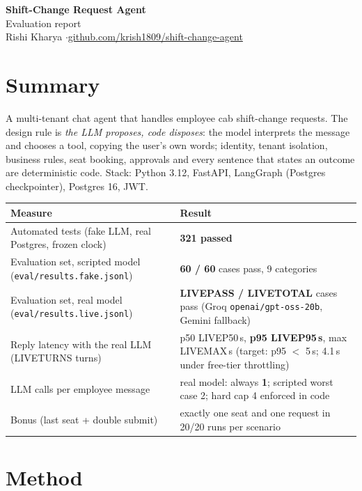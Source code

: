\documentclass[10.5pt,a4paper]{article}
\newcommand{\livepass}{LIVEPASS}
\newcommand{\livetotal}{LIVETOTAL}
\newcommand{\livepfifty}{LIVEP50}
\newcommand{\liveninetyfive}{LIVEP95}
\newcommand{\livemax}{LIVEMAX}
\newcommand{\liveturns}{LIVETURNS}
\begin{document}
\begin{center}
{\LARGE\bfseries Shift-Change Request Agent}\\[3pt]
{\large Evaluation report}\\[4pt]
{\small Rishi Kharya \quad$\cdot$\quad \href{https://github.com/krish1809/shift-change-agent}{github.com/krish1809/shift-change-agent}}
\end{center}

\section{Summary}

A multi-tenant chat agent that handles employee cab shift-change requests. The design rule is
\emph{the LLM proposes, code disposes}: the model interprets the message and chooses a tool, copying the user's
own words; identity, tenant isolation, business rules, seat booking, approvals and every sentence that states an
outcome are deterministic code. Stack: Python 3.12, FastAPI, LangGraph (Postgres checkpointer), Postgres 16, JWT.

\begin{center}
\begin{tabularx}{\textwidth}{lL}
\toprule
\textbf{Measure} & \textbf{Result} \\
\midrule
Automated tests (fake LLM, real Postgres, frozen clock) & \textbf{321 passed} \\
Evaluation set, scripted model (\texttt{eval/results.fake.jsonl}) & \textbf{60 / 60} cases pass, 9 categories \\
Evaluation set, real model (\texttt{eval/results.live.jsonl}) & \textbf{\livepass{} / \livetotal{}} cases pass (Groq \texttt{openai/gpt-oss-20b}, Gemini fallback) \\
Reply latency with the real LLM (\liveturns{} turns) & p50 \livepfifty{}\,s, \textbf{p95 \liveninetyfive{}\,s}, max \livemax{}\,s \quad (target: p95 $<$ 5\,s; 4.1\,s under free-tier throttling) \\
LLM calls per employee message & real model: always \textbf{1}; scripted worst case 2; hard cap 4 enforced in code \\
Bonus (last seat + double submit) & exactly one seat and one request in 20/20 runs per scenario \\
\bottomrule
\end{tabularx}
\end{center}

\section{Method}
\end{document}
